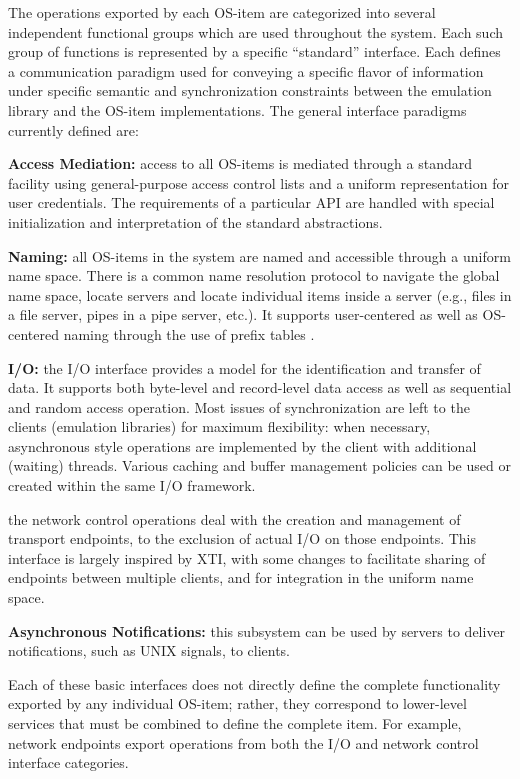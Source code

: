The operations exported by each OS-item are categorized into several
independent functional groups which are used throughout the
system. Each such group of functions is represented by a specific
``standard'' interface.  Each defines a communication paradigm
used for conveying a specific flavor of information under specific semantic
and synchronization constraints between the emulation library and the OS-item
implementations.
The general interface paradigms currently defined are:
\begin{description}
\item{\bf Access Mediation:} access to all OS-items
is mediated through a standard facility using general-purpose
access control lists and a uniform representation for user
credentials.  The requirements of a particular API are
handled with special initialization and interpretation of
the standard abstractions.

\item{\bf Naming:} all OS-items in the system are named and accessible
through a uniform name space. There is a common name resolution
protocol to navigate the global name space, locate servers and locate
individual items inside a server (e.g., files in a file server, pipes in
a pipe server, etc.).  It supports user-centered
as well as OS-centered naming 
through the use of prefix tables \cite{WELCH86}.

\item{\bf I/O:} the I/O interface provides a model for the
identification and transfer of data. It supports both byte-level and
record-level data access as well as sequential and random access
operation. Most issues of synchronization are left to the clients
(emulation libraries) for maximum flexibility: when necessary,
asynchronous style operations are implemented by the client with
additional (waiting) threads.
Various caching and buffer management policies
can be used or created within the same I/O framework.

\item [Network Control:] the network control operations deal with the
creation and management of transport endpoints, to the exclusion of
actual I/O on those endpoints.  This interface is largely inspired by
XTI\cite{XTI90}, with some changes to facilitate sharing of endpoints
between multiple clients, and for integration in the uniform name
space.

\item{\bf Asynchronous Notifications:} this subsystem can be used by
servers to deliver notifications, such as UNIX signals, to clients.
\end{description}
Each of these basic interfaces does not directly define the complete
functionality exported by any individual OS-item; rather, they correspond
to lower-level services that must be combined to define the complete
item.  For example, network endpoints export operations from
both the I/O and network control interface categories.

